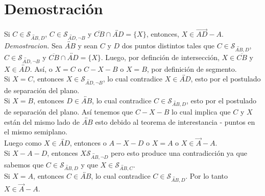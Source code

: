 \documentclass{report}
\begin{document}
    \tableofcontents

    \pagebreak
    \chapter{ Demostración }
        Si $C \in \mathcal{S}_{\overleftrightarrow{AB}, D}$, $C \in \mathcal{S}_{\overleftrightarrow{AD}, \neg B}$ y $\overline{CB} \cap \overleftrightarrow{AD} = \{X\}$, entonces, $X \in \overrightarrow{AD} - {A}$.\\

        \noindent \textit{Demostracion.} Sea $\overleftrightarrow{AB}$ y sean $C$ y $D$ dos puntos distintos tales que $C \in \mathcal{S}_{\overleftrightarrow{AB}, D}$, $C \in \mathcal{S}_{\overleftrightarrow{AD}, \neg B}$ y $\overline{CB} \cap \overleftrightarrow{AD} = \{X\}$. Luego, por definción de intersección, $X \in \overline{CB}$ y $X \in \overleftrightarrow{AD}$. Así, o $X = C$ o $C - X - B$ o $X = B$, por definición de segmento.\\

        \noindent Si $X = C$, entonces $X \in \mathcal{S}_{\overleftrightarrow{AD}, \neg B}$, lo cual contradice $X \in \overleftrightarrow{AD}$, esto por el postulado de separación del plano.\\

        \noindent Si $X = B$, entonces $D \in \overleftrightarrow{AB}$, lo cual contradice $C \in \mathcal{S}_{\overleftrightarrow{AB}, D}$, esto por el postulado de separación del plano. Así tenemos que $C - X - B$ lo cual implica que $C$ y $X$ están del mismo lado de $\overleftrightarrow{AB}$ esto debido al teorema de interestancia - puntos en el mismo semiplano.\\

        \noindent Luego como $X \in \overleftrightarrow{AD}$, entonces o $A - X - D$ o $X = A$ o $X \in \overrightarrow{A} - A$.\\

        \noindent Si $X - A - D$, entonces $X \mathcal{S}_{\overleftrightarrow{AB}, \neg D}$ pero esto produce una contradicción ya que sabemos que $C \in \mathcal{S}_{\overleftrightarrow{AB}, D}$ y que $X \in \mathcal{S}_{\overleftrightarrow{AB}, C}$.\\

        \noindent Si $X = A$, entonces $C \in \overleftrightarrow{AB}$, lo cual contradice $C \in \mathcal{S}_{\overleftrightarrow{AB}, D}$. Por lo tanto $X \in \overrightarrow{A} - A$.
\end{document}
